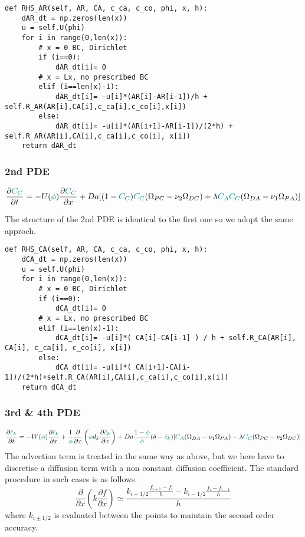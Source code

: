 \documentclass[a4paper]{article}
\begin{document}
\begin{lstlisting}
def RHS_AR(self, AR, CA, c_ca, c_co, phi, x, h):
    dAR_dt = np.zeros(len(x))
    u = self.U(phi)
    for i in range(0,len(x)):
        # x = 0 BC, Dirichlet
        if (i==0):
            dAR_dt[i]= 0
        # x = Lx, no prescribed BC
        elif (i==len(x)-1):
            dAR_dt[i]= -u[i]*(AR[i]-AR[i-1])/h + self.R_AR(AR[i],CA[i],c_ca[i],c_co[i],x[i])
        else:
            dAR_dt[i]= -u[i]*(AR[i+1]-AR[i-1])/(2*h) + self.R_AR(AR[i],CA[i],c_ca[i],c_co[i], x[i])    
    return dAR_dt
\end{lstlisting}

\subsubsection*{2nd PDE}
\[
\frac{\partial {\color{teal}C_C}}{\partial t} 
= -U({\color{teal}\phi}) \frac{\partial {\color{teal}C_C}}{\partial x}  
+ Da[(1-{\color{teal}C_C}){\color{teal}C_C}(\Omega_{PC}-\nu_2\Omega_{DC})+
\lambda {\color{teal}C_AC_C} (\Omega_{DA}-\nu_1\Omega_{PA})]
\]

The structure of the 2nd PDE is identical to the first 
one so we adopt the same approch.

\begin{lstlisting}
def RHS_CA(self, AR, CA, c_ca, c_co, phi, x, h):
    dCA_dt = np.zeros(len(x))
    u = self.U(phi)
    for i in range(0,len(x)):
        # x = 0 BC, Dirichlet
        if (i==0):
            dCA_dt[i]= 0
        # x = Lx, no prescribed BC
        elif (i==len(x)-1):
            dCA_dt[i]= -u[i]*( CA[i]-CA[i-1] ) / h + self.R_CA(AR[i], CA[i], c_ca[i], c_co[i], x[i])
        else:
            dCA_dt[i]= -u[i]*( CA[i+1]-CA[i-1])/(2*h)+self.R_CA(AR[i],CA[i],c_ca[i],c_co[i],x[i])
    return dCA_dt
\end{lstlisting}

\subsubsection*{3rd \& 4th PDE}

\[
\frac{\partial {\color{teal}\hat{c}_k}}{\partial t} 
= -W({\color{teal}\phi}) \frac{\partial {\color{teal}\hat{c}_k}}{\partial x}
+\frac{1}{\color{teal}\phi} \frac{\partial}{\partial x} 
\left( {\color{teal}\phi} d_k \frac{\partial {\color{teal}\hat{c}_k}}{\partial x} \right)
+Da \frac{1-{\color{teal}\phi}}{{\color{teal}\phi}}(\delta-{\color{teal}\hat{c}_k})
[{\color{teal}C_A}(\Omega_{DA}-\nu_1\Omega_{PA})-\lambda 
{\color{teal}C_C} (\Omega_{PC}-\nu_2 \Omega_{DC})  ]
\]
The advection term is treated in the same way as above, but we here have to discretise 
a diffusion term with a non constant diffusion coefficient.
The standard procedure in such cases is as follows:
\[
\frac{\partial }{\partial x} \left( k \frac{\partial f}{\partial x} \right)
\simeq
\frac{
k_{i+1/2} \frac{f_{i+1}-f_i}{h}
-
k_{i-1/2} \frac{f_{i}-f_{i-1}}{h}
}{h}
\] 
where $k_{i\pm 1/2}$ is evaluated between the points to maintain the 
second order accuracy.
\end{document}
